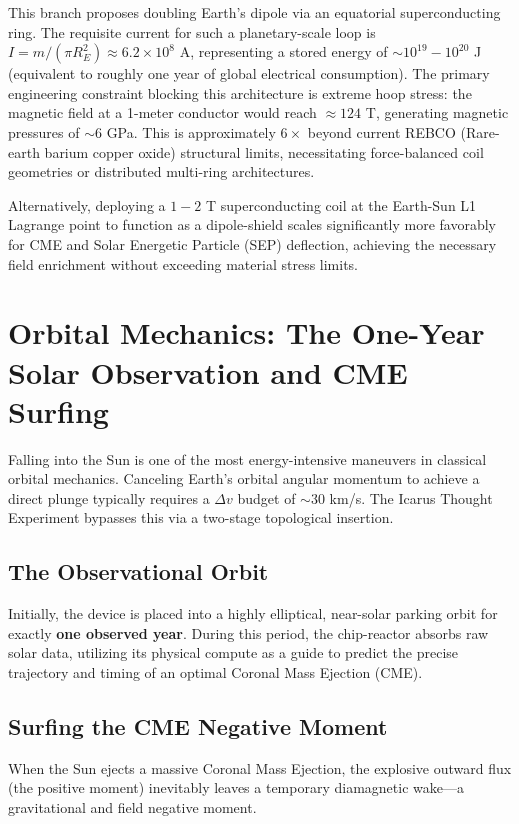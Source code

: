 This branch proposes doubling Earth's dipole via an equatorial superconducting ring. The requisite current for such a planetary-scale loop is $I = m / (\pi R_E^2) \approx 6.2 \times 10^8$ A, representing a stored energy of $\sim 10^{19} - 10^{20}$ J (equivalent to roughly one year of global electrical consumption). The primary engineering constraint blocking this architecture is extreme hoop stress: the magnetic field at a 1-meter conductor would reach $\approx 124$ T, generating magnetic pressures of $\sim 6$ GPa. This is approximately $6\times$ beyond current REBCO (Rare-earth barium copper oxide) structural limits, necessitating force-balanced coil geometries or distributed multi-ring architectures.

Alternatively, deploying a $1 - 2$ T superconducting coil at the Earth-Sun L1 Lagrange point to function as a dipole-shield scales significantly more favorably for CME and Solar Energetic Particle (SEP) deflection, achieving the necessary field enrichment without exceeding material stress limits.

\section[Orbital Mechanics]{Orbital Mechanics: The One-Year Solar Observation and CME Surfing}
Falling into the Sun is one of the most energy-intensive maneuvers in classical orbital mechanics. Canceling Earth's orbital angular momentum to achieve a direct plunge typically requires a $\Delta v$ budget of $\sim 30$ km/s. The Icarus Thought Experiment bypasses this via a two-stage topological insertion.

\subsection{The Observational Orbit}
Initially, the device is placed into a highly elliptical, near-solar parking orbit for exactly \textbf{one observed year}. During this period, the chip-reactor absorbs raw solar data, utilizing its physical compute as a guide to predict the precise trajectory and timing of an optimal Coronal Mass Ejection (CME).

\subsection{Surfing the CME Negative Moment}
When the Sun ejects a massive Coronal Mass Ejection, the explosive outward flux (the positive moment) inevitably leaves a temporary diamagnetic wake—a gravitational and field negative moment. 


